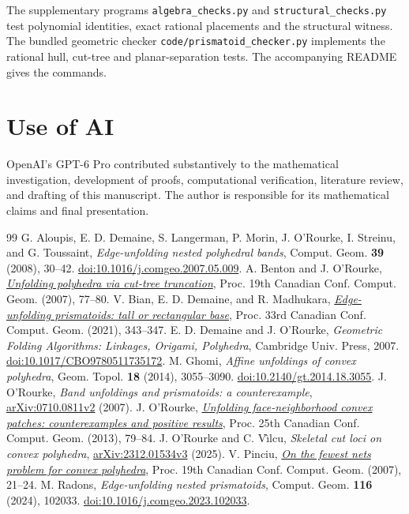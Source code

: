 \documentclass[11pt]{amsart}
\begin{document}
The supplementary programs \texttt{algebra\_checks.py} and \texttt{structural\_checks.py} test polynomial identities, exact rational placements and the structural witness. The bundled geometric checker \texttt{code/prismatoid\_checker.py} implements the rational hull, cut-tree and planar-separation tests. The accompanying README gives the commands.

\section*{Use of AI}
OpenAI's GPT-6 Pro contributed substantively to the mathematical investigation, development of proofs, computational verification, literature review, and drafting of this manuscript. The author is responsible for its mathematical claims and final presentation.

\begin{thebibliography}{99}
 G. Aloupis, E. D. Demaine, S. Langerman, P. Morin, J. O'Rourke, I. Streinu, and G. Toussaint,
\emph{Edge-unfolding nested polyhedral bands}, Comput. Geom. \textbf{39} (2008), 30--42. \href{https://doi.org/10.1016/j.comgeo.2007.05.009}{doi:10.1016/j.comgeo.2007.05.009}.
 A. Benton and J. O'Rourke,
\href{https://cccg.ca/proceedings/2007/03b4full.pdf}{\emph{Unfolding polyhedra via cut-tree truncation}}, Proc. 19th Canadian Conf. Comput. Geom. (2007), 77--80.
 V. Bian, E. D. Demaine, and R. Madhukara,
\href{https://erikdemaine.org/papers/Prismatoids_CCCG2021/paper.pdf}{\emph{Edge-unfolding prismatoids: tall or rectangular base}}, Proc. 33rd Canadian Conf. Comput. Geom. (2021), 343--347.
 E. D. Demaine and J. O'Rourke,
\emph{Geometric Folding Algorithms: Linkages, Origami, Polyhedra}, Cambridge Univ. Press, 2007. \href{https://doi.org/10.1017/CBO9780511735172}{doi:10.1017/CBO9780511735172}.
 M. Ghomi,
\emph{Affine unfoldings of convex polyhedra}, Geom. Topol. \textbf{18} (2014), 3055--3090. \href{https://doi.org/10.2140/gt.2014.18.3055}{doi:10.2140/\allowbreak gt.2014.18.3055}.
 J. O'Rourke,
\emph{Band unfoldings and prismatoids: a counterexample}, \href{https://arxiv.org/abs/0710.0811v2}{arXiv:0710.0811v2} (2007).
 J. O'Rourke,
\href{https://cccg.ca/proceedings/2013/papers/paper_22.pdf}{\emph{Unfolding face-neighborhood convex patches: counterexamples and positive results}}, Proc. 25th Canadian Conf. Comput. Geom. (2013), 79--84.
 J. O'Rourke and C. V\^{\i}lcu,
\emph{Skeletal cut loci on convex polyhedra}, \href{https://arxiv.org/abs/2312.01534v3}{arXiv:2312.01534v3} (2025).
 V. Pinciu,
\href{https://cccg.ca/proceedings/2007/01a4.pdf}{\emph{On the fewest nets problem for convex polyhedra}}, Proc. 19th Canadian Conf. Comput. Geom. (2007), 21--24.
 M. Radons,
\emph{Edge-unfolding nested prismatoids}, Comput. Geom. \textbf{116} (2024), 102033. \href{https://doi.org/10.1016/j.comgeo.2023.102033}{doi:10.1016/\allowbreak j.comgeo.2023.102033}.
\end{thebibliography}
\end{document}
